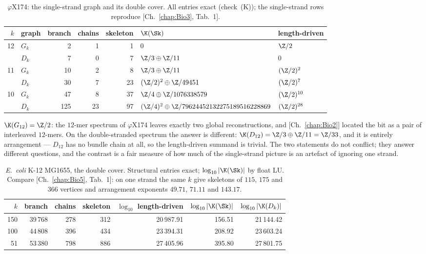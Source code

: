 \begin{table}[ht]
\centering\footnotesize
\begin{tabular}{rlrrrll}
\toprule
$k$ & graph & branch & chains & skeleton & $\K(\Sk)$ & length-driven\\
\midrule
12 & $G_k$ &   2 &  1 &  1 & $0$ & $\Z/2$\\
   & $D_k$ &   7 &  0 &  7 & $\Z/3\oplus\Z/11$ & $0$\\[2pt]
11 & $G_k$ &  10 &  2 &  8 & $\Z/3\oplus\Z/11$ & $(\Z/2)^{2}$\\
   & $D_k$ &  30 &  7 & 23 & $(\Z/2)^{2}\oplus\Z/49451$ & $(\Z/2)^{7}$\\[2pt]
10 & $G_k$ &  47 &  8 & 37 & $\Z/4\oplus\Z/1076338579$ & $(\Z/2)^{10}$\\
   & $D_k$ & 125 & 23 & 97 & $(\Z/4)^{2}\oplus\Z/79624452132275189516228869$ & $(\Z/2)^{28}$\\
\bottomrule
\end{tabular}
\caption{$\varphi$X174: the single-strand graph and its double cover. All entries exact
(check~(K)); the single-strand rows reproduce [Ch.~\ref{chap:Bio3}, Tab.~1].}
\label{Bio6:tab:phix}
\end{table}

\begin{remark}\label{Bio6:rem:bit}
$\K(G_{12})=\Z/2$: the $12$-mer spectrum of $\varphi$X174 leaves exactly two global
reconstructions, and [Ch.~\ref{chap:Bio2}] located the bit as a pair of interleaved $12$-mers. On
the double-stranded spectrum the answer is different: $\K(D_{12})=\Z/3\oplus\Z/11=\Z/33$,
and it is entirely arrangement --- $D_{12}$ has no bundle chain at all, so the
length-driven summand is trivial. The two statements do not conflict; they answer
different questions, and the contrast is a fair measure of how much of the single-strand
picture is an artefact of ignoring one strand.
\end{remark}

\begin{table}[ht]
\centering\small
\begin{tabular}{rrrrrrr}
\toprule
$k$ & branch & chains & skeleton & $\log_{10}$ length-driven & $\log_{10}|\K(\Sk)|$
& $\log_{10}|\K(D_k)|$\\
\midrule
150 & 39\,768 & 278 & 312 & 20\,987.91 & 156.51 & 21\,144.42\\
100 & 44\,808 & 396 & 434 & 23\,394.31 & 208.92 & 23\,603.24\\
 51 & 53\,380 & 798 & 886 & 27\,405.96 & 395.80 & 27\,801.75\\
\bottomrule
\end{tabular}
\caption{\emph{E.\ coli} K-12 MG1655, the double cover. Structural entries exact;
$\log_{10}|\K(\Sk)|$ by float LU. Compare [Ch.~\ref{chap:Bio5}, Tab.~1]: on one strand the same $k$
give skeletons of $115$, $175$ and $366$ vertices and arrangement exponents $49.71$,
$71.11$ and $143.17$.}
\label{Bio6:tab:ecoli}
\end{table}

